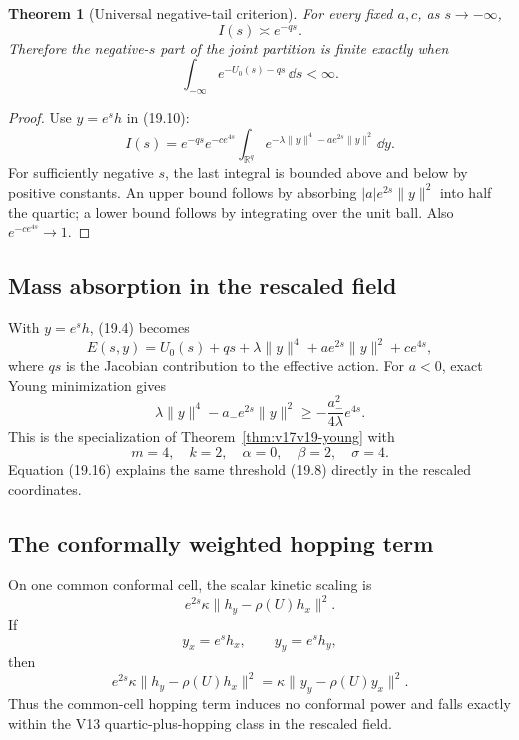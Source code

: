 \documentclass[11pt]{article}
\newtheorem{theorem}{Theorem}[section]
\theoremstyle{remark}
\begin{document}
\begin{theorem}[Universal negative-tail criterion]
\label{thm:v17v19-negative-tail}
For every fixed \(a,c\), as \(s\to-\infty\),
\[
 I(s)\asymp e^{-qs}.                               \tag{19.13}
\]
Therefore the negative-\(s\) part of the joint partition is finite
exactly when
\[
 \int_{-\infty}
 e^{-U_0(s)-qs}\,\dd s<\infty.                    \tag{19.14}
\]
\end{theorem}

\begin{proof}
Use \(y=e^sh\) in (19.10):
\[
 I(s)=e^{-qs}e^{-ce^{4s}}
 \int_{\mathbb R^q}
 e^{-\lambda\|y\|^4-ae^{2s}\|y\|^2}\,\dd y.
\]
For sufficiently negative \(s\), the last integral is bounded
above and below by positive constants.  An upper bound follows by
absorbing \(|a|e^{2s}\|y\|^2\) into half the quartic; a lower bound
follows by integrating over the unit ball.  Also
\(e^{-ce^{4s}}\to1\).
\end{proof}

\subsection{Mass absorption in the rescaled field}

With \(y=e^sh\), (19.4) becomes
\[
 E(s,y)
 =U_0(s)+qs+\lambda\|y\|^4
 +ae^{2s}\|y\|^2+ce^{4s},                          \tag{19.15}
\]
where \(qs\) is the Jacobian contribution to the effective action.
For \(a<0\), exact Young minimization gives
\[
 \lambda\|y\|^4-a_-e^{2s}\|y\|^2
 \geq-\frac{a_-^2}{4\lambda}e^{4s}.                \tag{19.16}
\]
This is the specialization of
Theorem~\ref{thm:v17v19-young} with
\[
 m=4,\quad k=2,\quad\alpha=0,\quad\beta=2,
 \quad\sigma=4.                                    \tag{19.17}
\]
Equation (19.16) explains the same threshold (19.8) directly in
the rescaled coordinates.

\subsection{The conformally weighted hopping term}

On one common conformal cell, the scalar kinetic scaling is
\[
 e^{2s}\kappa\|h_y-\rho(U)h_x\|^2.                 \tag{19.18}
\]
If
\[
 y_x=e^sh_x,\qquad y_y=e^sh_y,
\]
then
\[
 e^{2s}\kappa\|h_y-\rho(U)h_x\|^2
 =\kappa\|y_y-\rho(U)y_x\|^2.                      \tag{19.19}
\]
Thus the common-cell hopping term induces no conformal power and
falls exactly within the V13 quartic-plus-hopping class in the
rescaled field.
\end{document}
